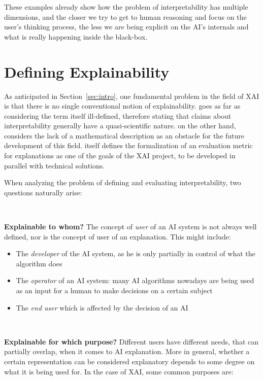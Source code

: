 \documentclass[conference]{IEEEtran}
\begin{document}
These examples already show how the problem of interpretability has multiple dimensions, and the closer we try to get to human reasoning and focus on the user's thinking process, the less we are being explicit on the AI's internals and what is really happening inside the black-box.

\section{Defining Explainability}
\label{sec:explainability}

As anticipated in Section~\ref{sec:intro}, one fundamental problem in
the field of XAI is that there is no single conventional notion of
explainability.
\citet{mythos} goes as far as considering the term itself ill-defined, therefore
stating that claims about interpretability generally have a quasi-scientific
nature. \citet{Giannotti} on the other hand, considers the lack of a mathematical description as an obstacle for the
future development of this field. \citet{DARPA} itself defines the
formalization of an evaluation metric for explanations as one of the goals of
the XAI project, to be developed in parallel with technical solutions.

When analyzing the problem of defining and evaluating interpretability, two questions naturally arise:

\

\textbf{Explainable to whom?} The concept of \textit{user} of an AI system is
not always well defined, nor is the concept of user of an explanation. This
might include:

\begin{itemize}
    \item The \textit{developer} of the AI system, as he is only partially in
          control of what the algorithm does
    \item The \textit{operator} of an AI system: many AI algorithms nowadays are
          being used as an input for a human to make decisions on a certain
          subject
    \item The \textit{end user} which is affected by the decision of an AI
\end{itemize}

\

\textbf{Explainable for which purpose?} Different users have different needs,
that can partially overlap, when it comes to AI explanation. More in general,
whether a certain representation can be considered explanatory depends to some
degree on what it is being used for. In the case of XAI, some common purposes
are:
\end{document}
